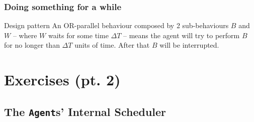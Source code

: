 \documentclass[presentation]{beamer}\mode<presentation>{\usetheme{AMSCesenaPurpleAndGold}}
\begin{document}
\begin{frame}
    \frametitle{Doing something for a while}

    \begin{block}{Design pattern}
        An OR-parallel behaviour composed by 2 sub-behaviours $B$ and $W$ -- where $W$ waits for some time $\Delta T$ -- means the agent will try to perform $B$ for no longer than $\Delta T$ units of time. After that $B$ will be interrupted.
    \end{block}

    

\end{frame}

\section{Exercises (pt. 2)}

\startExercise

\subsection{The \texttt{Agent}s' Internal Scheduler}
\end{document}
